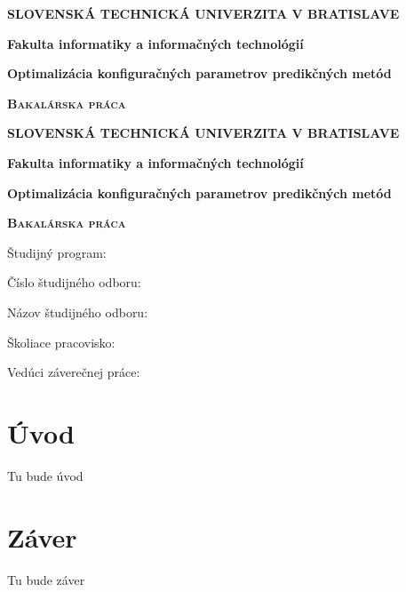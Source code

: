 \documentclass[12pt,oneside,slovak,a4paper]{book}
\begin{document}
\begin{titlepage}
	\centering
	{\large \textbf{SLOVENSKÁ TECHNICKÁ UNIVERZITA V BRATISLAVE} \par}
	\vspace{0.5cm}
	{\large \textbf{Fakulta informatiky a informačných technológií} \par}
	\vspace{6cm}
	{\huge\bfseries Optimalizácia konfiguračných parametrov predikčných metód \par}
	\vspace{2cm}
	{\scshape\large \textbf{Bakalárska práca} \par}
	\vspace{12.5cm}
	\vfill
\end{titlepage}

\begin{titlepage}
	\centering
	{\large \textbf{SLOVENSKÁ TECHNICKÁ UNIVERZITA V BRATISLAVE} \par}
	\vspace{0.5cm}
	{\large \textbf{Fakulta informatiky a informačných technológií} \par}
	\vspace{6cm}
	{\huge\bfseries Optimalizácia konfiguračných parametrov predikčných metód \par}
	\vspace{2cm}
	{\scshape\large \textbf{Bakalárska práca} \par}
	\vspace{5.5cm}
	\raggedright
	{\normalsize Študijný program: \par}
	{\normalsize Číslo študijného odboru: \par}
	{\normalsize Názov študijného odboru: \par}
	{\normalsize Školiace pracovisko: \par}
	{\normalsize Vedúci záverečnej práce: \par}
	\vspace{4.5cm}
\end{titlepage}


\tableofcontents




\chapter{Úvod}
Tu bude úvod

\chapter{Záver} \label{zaver}
Tu bude záver
\end{document}
